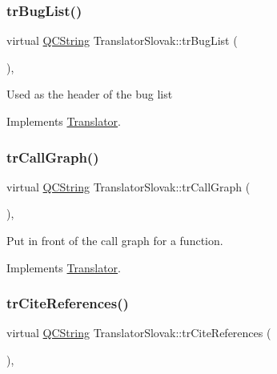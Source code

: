 \subsubsection{\texorpdfstring{trBugList()}{trBugList()}}
{\footnotesize\ttfamily virtual \mbox{\hyperlink{class_q_c_string}{Q\+C\+String}} Translator\+Slovak\+::tr\+Bug\+List (\begin{DoxyParamCaption}{ }\end{DoxyParamCaption})\hspace{0.3cm}{\ttfamily [inline]}, {\ttfamily [virtual]}}

Used as the header of the bug list 

Implements \mbox{\hyperlink{class_translator}{Translator}}.

\mbox{\label{class_translator_slovak_ad42e2129331227e0db60df2a075bebb8}} 
\subsubsection{\texorpdfstring{trCallGraph()}{trCallGraph()}}
{\footnotesize\ttfamily virtual \mbox{\hyperlink{class_q_c_string}{Q\+C\+String}} Translator\+Slovak\+::tr\+Call\+Graph (\begin{DoxyParamCaption}{ }\end{DoxyParamCaption})\hspace{0.3cm}{\ttfamily [inline]}, {\ttfamily [virtual]}}

Put in front of the call graph for a function. 

Implements \mbox{\hyperlink{class_translator}{Translator}}.

\mbox{\label{class_translator_slovak_ab6539bf4a7bdce6113ed9b15a9074aba}} 
\subsubsection{\texorpdfstring{trCiteReferences()}{trCiteReferences()}}
{\footnotesize\ttfamily virtual \mbox{\hyperlink{class_q_c_string}{Q\+C\+String}} Translator\+Slovak\+::tr\+Cite\+References (\begin{DoxyParamCaption}{ }\end{DoxyParamCaption})\hspace{0.3cm}{\ttfamily [inline]}, {\ttfamily [virtual]}}


